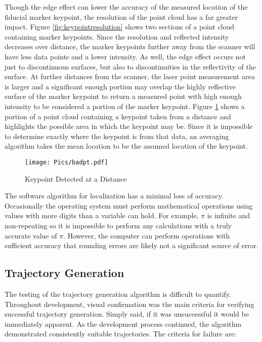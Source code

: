 Though the edge effect can lower the accuracy of the measured location of the fiducial marker keypoint, the resolution of the point cloud has a far greater impact. Figure \ref{fig:keypointresolution} shows two sections of a point cloud containing marker keypoints. Since the resolution and reflected intensity decreases over distance, the marker keypoints further away from the scanner will have less data points and a lower intensity. As well, the edge effect occurs not just to discontinuous surfaces, but also to discontinuities in the reflectivity of the surface. At further distances from the scanner, the laser point measurement area is larger and a significant enough portion may overlap the highly reflective surface of the marker keypoint to return a measured point with high enough intensity to be considered a portion of the marker keypoint. Figure \ref{fig:keypointinaccuracy} shows a portion of a point cloud containing a keypoint taken from a distance and highlights the possible area in which the keypoint may be. Since it is impossible to determine exactly where the keypoint is from that data, an averaging algorithm takes the mean location to be the assumed location of the keypoint.\\ 

\begin{figure}[h]
    \centering
    \texttt{[image: Pics/badpt.pdf]}
    \caption{Keypoint Detected at a Distance}
    \label{fig:keypointinaccuracy}
\end{figure}
The software algorithm for localization has a minimal loss of accuracy. Occasionally the operating system must perform mathematical operations using values with more digits than a variable can hold. For example, $\pi$ is infinite and non-repeating so it is impossible to perform any calculations with a truly accurate value of $\pi$. However, the computer can perform operations with sufficient accuracy that rounding errors are likely not a significant source of error.\\

\subsection{Trajectory Generation}

The testing of the trajectory generation algorithm is difficult to quantify. Throughout development, visual confirmation was the main criteria for verifying successful trajectory generation. Simply said, if it was unsuccessful it would be immediately apparent. As the development process continued, the algorithm demonstrated consistently suitable trajectories. The criteria for failure are:

